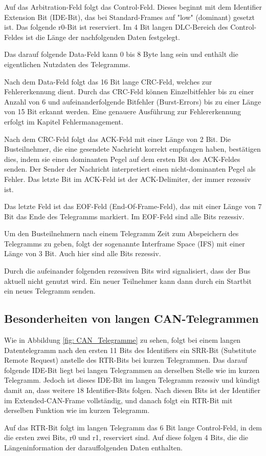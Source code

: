 Auf das Arbitration-Feld folgt das Control-Feld. Dieses beginnt mit dem Identifier Extension Bit (IDE-Bit), das bei Standard-Frames auf "low" (dominant) gesetzt ist. Das folgende r0-Bit ist reserviert. Im 4 Bit langen DLC-Bereich des Control-Feldes ist die Länge der nachfolgenden Daten festgelegt.

Das darauf folgende Data-Feld kann 0 bis 8 Byte lang sein und enthält die eigentlichen Nutzdaten des Telegramms.

Nach dem Data-Feld folgt das 16 Bit lange CRC-Feld, welches zur Fehlererkennung dient. Durch das CRC-Feld können Einzelbitfehler bis zu einer Anzahl von 6 und aufeinanderfolgende Bitfehler (Burst-Errors) bis zu einer Länge von 15 Bit erkannt werden. Eine genauere Ausführung zur Fehlererkennung erfolgt im Kapitel Fehlermanagement.

Nach dem CRC-Feld folgt das ACK-Feld mit einer Länge von 2 Bit. Die Busteilnehmer, die eine gesendete Nachricht korrekt empfangen haben, bestätigen dies, indem sie einen dominanten Pegel auf dem ersten Bit des ACK-Feldes senden. Der Sender der Nachricht interpretiert einen nicht-dominanten Pegel als Fehler. Das letzte Bit im ACK-Feld ist der ACK-Delimiter, der immer rezessiv ist.

Das letzte Feld ist das EOF-Feld (End-Of-Frame-Feld), das mit einer Länge von 7 Bit das Ende des Telegramms markiert. Im EOF-Feld sind alle Bits rezessiv.

Um den Busteilnehmern nach einem Telegramm Zeit zum Abspeichern des Telegramms zu geben, folgt der sogenannte Interframe Space (IFS) mit einer Länge von 3 Bit. Auch hier sind alle Bits rezessiv.

Durch die aufeinander folgenden rezessiven Bits wird signalisiert, dass der Bus aktuell nicht genutzt wird. Ein neuer Teilnehmer kann dann durch ein Startbit ein neues Telegramm senden.

\subsection{Besonderheiten von langen CAN-Telegrammen}
Wie in Abbildung \ref{fig: CAN_Telegramme} zu sehen, folgt bei einem langen Datentelegramm nach den ersten 11 Bits des Identifiers ein SRR-Bit (Substitute Remote Request) anstelle des RTR-Bits bei kurzen Telegrammen. Das darauf folgende IDE-Bit liegt bei langen Telegrammen an derselben Stelle wie im kurzen Telegramm. Jedoch ist dieses IDE-Bit im langen Telegramm rezessiv und kündigt damit an, dass weitere 18 Identifier-Bits folgen. Nach diesen Bits ist der Identifier im Extended-CAN-Frame vollständig, und danach folgt ein RTR-Bit mit derselben Funktion wie im kurzen Telegramm.

Auf das RTR-Bit folgt im langen Telegramm das 6 Bit lange Control-Feld, in dem die ersten zwei Bits, r0 und r1, reserviert sind. Auf diese folgen 4 Bits, die die Längeninformation der darauffolgenden Daten enthalten.









